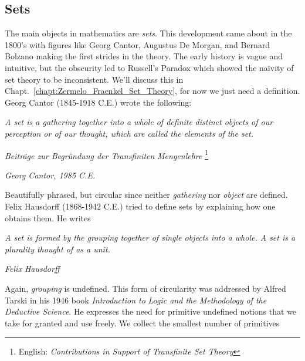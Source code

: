     \subsection{Sets}
        The main objects in mathematics are \textit{sets}. This development came
        about in the 1800's with figures like Georg Cantor,
        Augustus De Morgan, and Bernard
        Bolzano making the first strides in the theory.
        The early history is vague and intuitive, but the obscurity
        led to Russell's Paradox which showed the
        na\"{i}vity of set theory to be inconsistent. We'll discuss this in
        Chapt.~\ref{chapt:Zermelo_Fraenkel_Set_Theory}, for now we just need a
        definition. Georg Cantor (1845-1918 C.E.) wrote the following:
        \begin{center}
            \textit{A set is a gathering together into a whole of definite}
            \textit{distinct objects of our perception or of our thought, which}
            \textit{are called the elements of the set.}
            \par\hfill
            \textit{Beitr\"{a}ge zur Begr\"{u}ndung der Transfiniten}
            \textit{Mengenlehre}%
            \footnote{%
                English:
                \textit{Contributions in Support of Transfinite Set Theory}%
            }
            \par\hfill
            \textit{Georg Cantor, 1985 C.E.}
        \end{center}
        Beautifully phrased, but circular since neither \textit{gathering} nor
        \textit{object} are defined. Felix Hausdorff
        (1868-1942 C.E.) tried to define sets by explaining how one obtains
        them. He writes
        \begin{center}
            \textit{A set is formed by the grouping together of single objects}
            \textit{into a whole. A set is a plurality thought of as a unit.}
            \par\hfill
            \textit{Felix Hausdorff}
        \end{center}
        Again, \textit{grouping} is undefined. This form of circularity was
        addressed by Alfred Tarski in his 1946 book \textit{Introduction to}
        \textit{Logic and the Methodology of the Deductive Science}. He
        expresses the need for primitive undefined notions that we take for
        granted and use freely. We collect the smallest number of primitives
